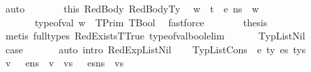 \begin{isabellebody}
\ auto\isanewline
\ \ \ \ \isamarkupfalse%
\ \isamarkupfalse%
\ this\ RedBody\ RedBodyTy\ \isamarkupfalse%
\ w{\isacharprime}{\kern0pt}\ \ {\isachardoublequoteopen}{\isasymLambda}{\isacharcomma}{\kern0pt}{\isasymGamma}{\isacharcomma}{\kern0pt}{\isacharparenleft}{\kern0pt}t{\isacharhash}{\kern0pt}{\isasymOmega}{\isacharparenright}{\kern0pt}\ {\isasymturnstile}\ {\isasymlangle}e{\isacharcomma}{\kern0pt}\ n{\isacharunderscore}{\kern0pt}s{\isasymrangle}\ {\isasymDown}\ w{\isacharprime}{\kern0pt}{\isachardoublequoteclose}\isanewline
\ \ \ \ \ \ \ {\isachardoublequoteopen}type{\isacharunderscore}{\kern0pt}of{\isacharunderscore}{\kern0pt}val\ w{\isacharprime}{\kern0pt}\ {\isacharequal}{\kern0pt}\ TPrim\ TBool{\isachardoublequoteclose}\ \isamarkupfalse%
\ fastforce\isanewline
\ \ \ \ \isamarkupfalse%
\ \isamarkupfalse%
\ {\isacharquery}{\kern0pt}thesis\isanewline
\ \ \ \ \ \isamarkupfalse%
\ {\isacharparenleft}{\kern0pt}metis\ {\isacharparenleft}{\kern0pt}full{\isacharunderscore}{\kern0pt}types{\isacharparenright}{\kern0pt}\ RedExistsT{\isacharunderscore}{\kern0pt}True\ type{\isacharunderscore}{\kern0pt}of{\isacharunderscore}{\kern0pt}val{\isacharunderscore}{\kern0pt}bool{\isacharunderscore}{\kern0pt}elim{\isacharparenright}{\kern0pt}\isanewline
\ \ \isamarkupfalse%
\isanewline
{}\isamarkupfalse%
\isanewline
\ \ \isamarkupfalse%
\ {\isacharparenleft}{\kern0pt}TypListNil\ {\isasymDelta}{\isacharparenright}{\kern0pt}\isanewline
\ \ \isamarkupfalse%
\ {\isacharquery}{\kern0pt}case\ \isanewline
\ \ \ \ \isamarkupfalse%
\ {\isacharparenleft}{\kern0pt}auto\ intro{\isacharcolon}{\kern0pt}\ RedExpListNil{\isacharparenright}{\kern0pt}\isanewline
{}\isamarkupfalse%
\isanewline
\ \ \isamarkupfalse%
\ {\isacharparenleft}{\kern0pt}TypListCons\ {\isasymDelta}\ e\ ty\ es\ tys{\isacharparenright}{\kern0pt}\isanewline
\ \ \isamarkupfalse%
\ {\isachardoublequoteopen}{\isasymexists}v{\isachardot}{\kern0pt}\ {\isasymLambda}{\isacharcomma}{\kern0pt}{\isasymGamma}{\isacharcomma}{\kern0pt}{\isasymOmega}\ {\isasymturnstile}\ {\isasymlangle}e{\isacharcomma}{\kern0pt}n{\isacharunderscore}{\kern0pt}s{\isasymrangle}\ {\isasymDown}\ v{\isachardoublequoteclose}\ \ {\isachardoublequoteopen}{\isasymexists}vs{\isachardot}{\kern0pt}\ {\isasymLambda}{\isacharcomma}{\kern0pt}{\isasymGamma}{\isacharcomma}{\kern0pt}{\isasymOmega}\ {\isasymturnstile}\ {\isasymlangle}es{\isacharcomma}{\kern0pt}n{\isacharunderscore}{\kern0pt}s{\isasymrangle}\ {\isacharbrackleft}{\kern0pt}{\isasymDown}{\isacharbrackright}{\kern0pt}\ vs{\isachardoublequoteclose}\isanewline

\end{isabellebody}
